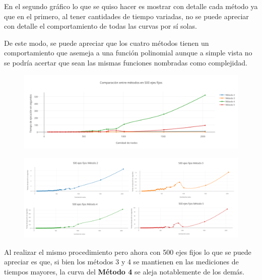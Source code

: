En el segundo gr\'afico lo que se quiso hacer es mostrar con detalle cada m\'etodo ya que en el primero, al tener cantidades de tiempo variadas, no se puede apreciar con detalle el comportamiento de todas las curvas por s\'i solas.

De este modo, se puede apreciar que los cuatro m\'etodos tienen un comportamiento que asemeja a una funci\'on polinomial aunque a simple vista no se podr\'ia acertar que sean las mismas funciones nombradas como complejidad.

\bigskip  
  
  \begin{figure}[h!]
   \begin{center}
 	\includegraphics[scale=0.55]{imagenes/local/tiempos/500ejes.png}
   \end{center}
 \end{figure}
 
   \begin{figure}[h!]
   \begin{center}
 	\includegraphics[scale=0.08]{imagenes/local/tiempos/500ejes2.png}
   \end{center}
 \end{figure}

Al realizar el mismo procedimiento pero ahora con 500 ejes fijos lo que se puede apreciar es que, si bien los m\'etodos 3 y 4 se mantienen en las mediciones de tiempos mayores, la curva del \textbf{M\'etodo 4} se aleja notablemente de los dem\'as.\\

